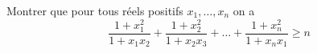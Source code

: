 Montrer que pour tous réels positifs $x_1, \dots, x_n$ on a
$$\frac{1 + x_1^2}{1 + x_1x_2} + \frac{1 + x_2^2}{1 + x_2x_3} + \dots + \frac{1+x_n^2}{1+x_nx_1}\ge n$$